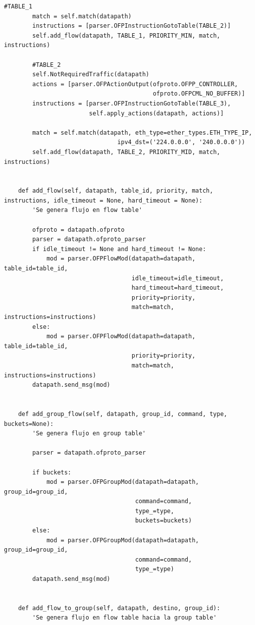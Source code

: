 \documentclass[12pt,a4paper,oneside]{book}
\begin{document}
\begin{lstlisting}[style=codigobase,  label = cod_correrP, caption= controlador.py]
        #TABLE_1
        match = self.match(datapath)
        instructions = [parser.OFPInstructionGotoTable(TABLE_2)]
        self.add_flow(datapath, TABLE_1, PRIORITY_MIN, match, instructions)

        #TABLE_2
        self.NotRequiredTraffic(datapath)
        actions = [parser.OFPActionOutput(ofproto.OFPP_CONTROLLER,
                                          ofproto.OFPCML_NO_BUFFER)]
        instructions = [parser.OFPInstructionGotoTable(TABLE_3),
                        self.apply_actions(datapath, actions)]

        match = self.match(datapath, eth_type=ether_types.ETH_TYPE_IP,
                                ipv4_dst=('224.0.0.0', '240.0.0.0'))
        self.add_flow(datapath, TABLE_2, PRIORITY_MID, match, instructions)


    def add_flow(self, datapath, table_id, priority, match, instructions, idle_timeout = None, hard_timeout = None):
        'Se genera flujo en flow table'

        ofproto = datapath.ofproto
        parser = datapath.ofproto_parser
        if idle_timeout != None and hard_timeout != None:
            mod = parser.OFPFlowMod(datapath=datapath, table_id=table_id,
                                    idle_timeout=idle_timeout,
                                    hard_timeout=hard_timeout,
                                    priority=priority,
                                    match=match, instructions=instructions)
        else:
            mod = parser.OFPFlowMod(datapath=datapath, table_id=table_id,
                                    priority=priority,
                                    match=match, instructions=instructions)
        datapath.send_msg(mod)


    def add_group_flow(self, datapath, group_id, command, type, buckets=None):
        'Se genera flujo en group table'

        parser = datapath.ofproto_parser

        if buckets:
            mod = parser.OFPGroupMod(datapath=datapath, group_id=group_id,
                                     command=command,
                                     type_=type,
                                     buckets=buckets)
        else:
            mod = parser.OFPGroupMod(datapath=datapath, group_id=group_id,
                                     command=command,
                                     type_=type)
        datapath.send_msg(mod)


    def add_flow_to_group(self, datapath, destino, group_id):
        'Se genera flujo en flow table hacia la group table'


\end{lstlisting}
\end{document}

